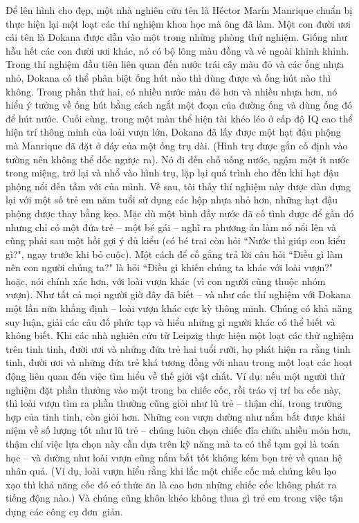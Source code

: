 \begin{multicols}{2}
	Để lên hình cho đẹp, một nhà nghiên cứu tên là Héctor Marín Manrique chuẩn bị thực hiện lại một loạt các thí nghiệm khoa học mà ông đã làm. Một con đười ươi cái tên là Dokana được dẫn vào một trong những phòng thử nghiệm. Giống như hầu hết các con đười ươi khác, nó có bộ lông màu đồng và vẻ ngoài khinh khỉnh. Trong thí nghiệm đầu tiên liên quan đến nước trái cây màu đỏ và các ống nhựa nhỏ, Dokana có thể phân biệt ống hút nào thì dùng được và ống hút nào thì không. Trong phần thứ hai, có nhiều nước màu đỏ hơn và nhiều nhựa hơn, nó hiểu ý tưởng về ống hút bằng cách ngắt một đoạn của đường ống và dùng ống đó để hút nước. Cuối cùng, trong một màn thể hiện tài khéo léo ở cấp độ IQ cao thể hiện trí thông minh của loài vượn lớn, Dokana đã lấy được một hạt đậu phộng mà Manrique đã đặt ở đáy của một ống trụ dài. (Hình trụ được gắn cố định vào tường nên không thể dốc ngược ra). Nó đi đến chỗ uống nước, ngậm một ít nước trong miệng, trở lại và nhổ vào hình trụ, lặp lại quá trình cho đến khi hạt đậu phộng nổi đến tầm với của mình. Về sau, tôi thấy thí nghiệm này được dàn dựng lại với một số trẻ em năm tuổi sử dụng các hộp nhựa nhỏ hơn, những hạt đậu phộng được thay bằng kẹo. Mặc dù một bình đầy nước đã cố tình được để gần đó nhưng chỉ có một đứa trẻ -- một bé gái -- nghĩ ra phương án làm nó nổi lên và cũng phải sau một hồi gợi ý đủ kiểu (có bé trai còn hỏi ``Nước thì giúp con kiểu gì?", ngay trước khi bỏ cuộc).
	\vskip 0.1cm
	Một cách để cố gắng trả lời câu hỏi ``Điều gì làm nên con người chúng ta?" là hỏi ``Điều gì khiến chúng ta khác với loài vượn?" hoặc, nói chính xác hơn, với loài vượn khác (vì con người cũng thuộc nhóm vượn). Như tất cả mọi người giờ đây đã biết -- và như các thí nghiệm với Dokana một lần nữa khẳng định -- loài vượn khác cực kỳ thông minh. Chúng có khả năng suy luận, giải các câu đố phức tạp và hiểu những gì người khác có thể biết và không biết. Khi các nhà nghiên cứu từ Leipzig thực hiện một loạt các thử nghiệm trên tinh tinh, đười ươi và những đứa trẻ hai tuổi rưỡi, họ phát hiện ra rằng tinh tinh, đười ươi và những đứa trẻ khá tương đồng với nhau trong một loạt các hoạt động liên quan đến việc tìm hiểu về thế giới vật chất. Ví dụ: nếu một người thử nghiệm đặt phần thưởng vào một trong ba chiếc cốc, rồi tráo vị trí ba cốc này, thì loài vượn tìm ra phần thưởng cũng giỏi như lũ trẻ -- thậm chí, trong trường hợp của tinh tinh, còn giỏi hơn. Những con vượn dường như nắm bắt được khái niệm về số lượng tốt như lũ trẻ -- chúng luôn chọn chiếc đĩa chứa nhiều món hơn, thậm chí việc lựa chọn này cần dựa trên kỹ năng mà ta có thể tạm gọi là toán học -- và dường như loài vượn cũng nắm bắt tốt không kém bọn trẻ về quan hệ nhân quả. (Ví dụ, loài vượn hiểu rằng khi lắc một chiếc cốc mà chúng kêu lạo xạo thì khả năng cốc đó có thức ăn là cao hơn những chiếc cốc không phát ra tiếng động nào.) Và chúng cũng khôn khéo không thua gì trẻ em trong việc tận dụng các công cụ đơn~giản.

\end{multicols}
